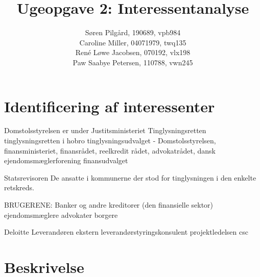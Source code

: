 \documentclass[10pt,a4paper,danish]{article}
\title{Ugeopgave 2: Interessentanalyse}
\author{Søren Pilgård, 190689, vpb984\\
Caroline Miller, 04071979, twq135\\
René Løwe Jacobsen, 070192, vlx198\\
Paw Saabye Petersen, 110788, vwn245}
\begin{document}
\maketitle
\newpage


\section{Identificering af interessenter}
Domstolsstyrelsen er under
Justitsministeriet
Tinglysningsretten
tinglysningsretten i hobro
tinglysningsudvalget - Domstolsstyrelsen, finansministeriet, finansrådet, reelkredit rådet, advokatrådet, dansk ejendomsmæglerforening
finansudvalget

Statsrevisoren
De ansatte i kommunerne der stod for tinglysningen i den enkelte retskreds.

BRUGERENE:
Banker og andre kreditorer (den finansielle sektor)
ejendomsmæglere
advokater
borgere

Deloitte
Leverandøren
ekstern leverandørstyringskonsulent
projektledelsen
csc

\section{Beskrivelse}
\end{document}
